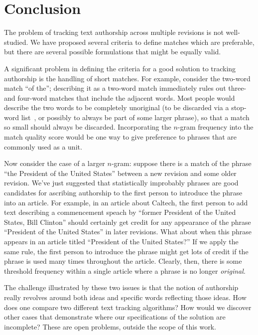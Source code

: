 \section{Conclusion}


The problem of tracking text authorship across multiple revisions
is not well-studied.
We have proposed several criteria to define matches which
are preferable, but there are several possible formulations
that might be equally valid.

A significant problem in defining the criteria for a
good solution to tracking authorship is the handling of short matches.
For example, consider the two-word match ``of the''; describing
it as a two-word match immediately rules out three- and four-word
matches that include the adjacent words.
Most people would describe the two words to be completely
unoriginal (to be discarded via a stop-word list~\cite{Kinzler2011},
or possibly to always be part of some larger phrase),
so that a match so small should always be discarded.
Incorporating the $n$-gram frequency into the match quality
score would be one way to give preference to phrases that
are commonly used as a unit.

Now consider the case of a larger $n$-gram: suppose there is a match
of the phrase ``the President of the United States'' between a new
revision and some older revision.
We've just suggested that statistically improbably phrases are
good candidates for ascribing authorship to the first person to
introduce the phrase into an article.
For example, in an article about Caltech, the first person to
add text describing a commencement speach by ``former President of
the United States, Bill Clinton'' should certainly get credit for
any appearance of the phrase ``President of the United States''
in later revisions.
What about when this phrase appears in an article titled
``President of the United States?''
If we apply the same rule, the first person to introduce the phrase
might get lots of credit if the phrase is used many times throughout
the article.
Clearly, then, there is some threshold frequency within a single
article where a phrase is no longer \textit{original}.

The challenge illustrated by these two issues is that the notion
of authorship really revolves around both ideas and specific
words reflecting those ideas.
How does one compare two different text tracking algorithms?
How would we discover other cases that demonstrate where our
specifications of the solution are incomplete?
These are open problems, outside the scope of this work.

